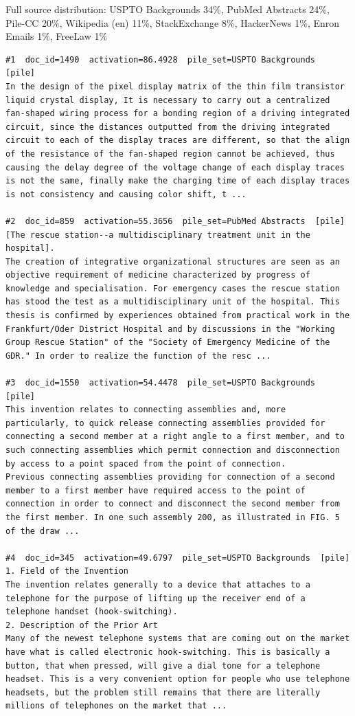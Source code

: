 Full source distribution: USPTO Backgrounds 34\%, PubMed Abstracts 24\%, Pile-CC 20\%, Wikipedia (en) 11\%, StackExchange 8\%, HackerNews 1\%, Enron Emails 1\%, FreeLaw 1\%

\begin{verbatim}
#1  doc_id=1490  activation=86.4928  pile_set=USPTO Backgrounds  [pile]
In the design of the pixel display matrix of the thin film transistor liquid crystal display, It is necessary to carry out a centralized fan-shaped wiring process for a bonding region of a driving integrated circuit, since the distances outputted from the driving integrated circuit to each of the display traces are different, so that the align of the resistance of the fan-shaped region cannot be achieved, thus causing the delay degree of the voltage change of each display traces is not the same, finally make the charging time of each display traces is not consistency and causing color shift, t ...

#2  doc_id=859  activation=55.3656  pile_set=PubMed Abstracts  [pile]
[The rescue station--a multidisciplinary treatment unit in the hospital].
The creation of integrative organizational structures are seen as an objective requirement of medicine characterized by progress of knowledge and specialisation. For emergency cases the rescue station has stood the test as a multidisciplinary unit of the hospital. This thesis is confirmed by experiences obtained from practical work in the Frankfurt/Oder District Hospital and by discussions in the "Working Group Rescue Station" of the "Society of Emergency Medicine of the GDR." In order to realize the function of the resc ...

#3  doc_id=1550  activation=54.4478  pile_set=USPTO Backgrounds  [pile]
This invention relates to connecting assemblies and, more particularly, to quick release connecting assemblies provided for connecting a second member at a right angle to a first member, and to such connecting assemblies which permit connection and disconnection by access to a point spaced from the point of connection.
Previous connecting assemblies providing for connection of a second member to a first member have required access to the point of connection in order to connect and disconnect the second member from the first member. In one such assembly 200, as illustrated in FIG. 5 of the draw ...

#4  doc_id=345  activation=49.6797  pile_set=USPTO Backgrounds  [pile]
1. Field of the Invention
The invention relates generally to a device that attaches to a telephone for the purpose of lifting up the receiver end of a telephone handset (hook-switching).
2. Description of the Prior Art
Many of the newest telephone systems that are coming out on the market have what is called electronic hook-switching. This is basically a button, that when pressed, will give a dial tone for a telephone headset. This is a very convenient option for people who use telephone headsets, but the problem still remains that there are literally millions of telephones on the market that ...


\end{verbatim}
